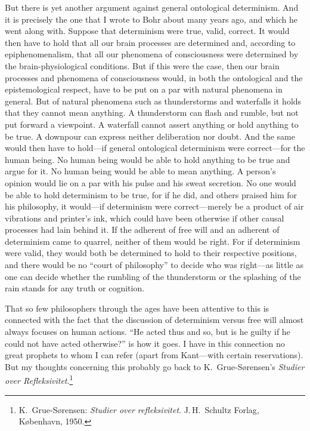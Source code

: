 \documentclass[12pt,a4paper]{book}
\begin{document}
But there is yet another argument against general ontological determinism. And it is precisely the one that I wrote to Bohr about many years ago, and which he went along with. Suppose that determinism were true, valid, correct. It would then have to hold that all our brain processes are determined and, according to epiphenomenalism, that all our phenomena of consciousness were determined by the brain-physiological conditions. But if this were the case, then our brain processes and phenomena of consciousness would, in both the ontological and the epistemological respect, have to be put on a par with natural phenomena in general. But of natural phenomena such as thunderstorms and waterfalls it holds that they cannot mean anything. A thunderstorm can flash and rumble, but not put forward a viewpoint. A waterfall cannot assert anything or hold anything to be true. A downpour can express neither deliberation nor doubt. And the same would then have to hold---if general ontological determinism were correct---for the human being. No human being would be able to hold anything to be true and argue for it. No human being would be able to mean anything. A person's opinion would lie on a par with his pulse and his sweat secretion. No one would be able to hold determinism to be true, for if he did, and others praised him for his philosophy, it would---if determinism were correct---merely be a product of air vibrations and printer's ink, which could have been otherwise if other causal processes had lain behind it. If the adherent of free will and an adherent of determinism came to quarrel, neither of them would be right. For if determinism were valid, they would both be determined to hold to their respective positions, and there would be no ``court of philosophy'' to decide who was right---as little as one can decide whether the rumbling of the thunderstorm or the splashing of the rain stands for any truth or cognition.

That so few philosophers through the ages have been attentive to this is connected with the fact that the discussion of determinism versus free will almost always focuses on human actions. ``He acted thus and so, but is he guilty if he could not have acted otherwise?'' is how it goes. I have in this connection no great prophets to whom I can refer (apart from Kant---with certain reservations). But my thoughts concerning this probably go back to K.~Grue-Sørensen's \emph{Studier over Refleksivitet}.\footnote{K.~Grue-Sørensen: \emph{Studier over refleksivitet}. J.\,H.~Schultz Forlag, København, 1950.}
\end{document}
